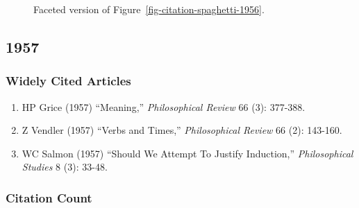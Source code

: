 \documentclass[
  10pt,
  letterpaper,
  DIV=11,
  numbers=noendperiod,
  twoside]{scrartcl}
\providecommand{\tightlist}{%
  \setlength{\itemsep}{0pt}\setlength{\parskip}{0pt}}\usepackage{longtable,booktabs,array}
\begin{document}
\begin{figure}


\caption{\label{fig-citation-facet-1956}Faceted version of
Figure~\ref{fig-citation-spaghetti-1956}.}

\end{figure}%

\newpage

\subsection{1957}\label{sec-s1957}

\subsubsection*{Widely Cited Articles}\label{widely-cited-articles-1}

\begin{enumerate}
\def\labelenumi{\arabic{enumi}.}
\tightlist
\item
  HP Grice (1957) ``Meaning,'' \emph{Philosophical Review} 66 (3):
  377-388.
\item
  Z Vendler (1957) ``Verbs and Times,'' \emph{Philosophical Review} 66
  (2): 143-160.
\item
  WC Salmon (1957) ``Should We Attempt To Justify Induction,''
  \emph{Philosophical Studies} 8 (3): 33-48.
\end{enumerate}

\subsubsection*{Citation Count}\label{sec-count-1957}
\end{document}
